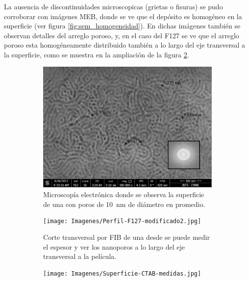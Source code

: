		La ausencia de discontinuidades microscopicas (grietas o fisuras) se pudo corroborar con imágenes MEB, donde se ve que el depósito es homogéneo en la superficie (ver figura \ref{fig:sem_homogeneidad}). En dichas imágenes también se observan detalles del arreglo poroso, y, en el caso del F127 se ve que el arreglo poroso esta homogéneamente distribuido también a lo largo del eje transversal a la superficie, como se muestra en la ampliación de la figura \ref{fig:sem_homogeneidad2}.

			\begin{figure}[th]
		 	   	    \begin{subfigure}[t]{0.49\textwidth}
			        	\includegraphics[width=\textwidth]{Imagenes/Superficie-F127-medidas.jpg}
			       		\caption{Microscopía electrónica donde se observa la superficie de una \pdmF\space con poros de \SI{10}{nm} de diámetro en promedio.}
			       		\label{fig:sem_homogeneidad1}
			       		\end{subfigure}
					\begin{subfigure}[t]{0.49\textwidth}
			 	   	    \texttt{[image: Imagenes/Perfil-F127-modificado2.jpg]}
			       		\caption{Corte transversal por FIB de una \pdmF\space desde se puede medir el espesor y ver los nanoporos a lo largo del eje transversal a la película.}
			       		\label{fig:sem_homogeneidad2}
			       		\end{subfigure}
			       	\begin{subfigure}[t]{0.49\textwidth}
			        	\texttt{[image: Imagenes/Superficie-CTAB-medidas.jpg]}

\end{subfigure}
\end{figure}
